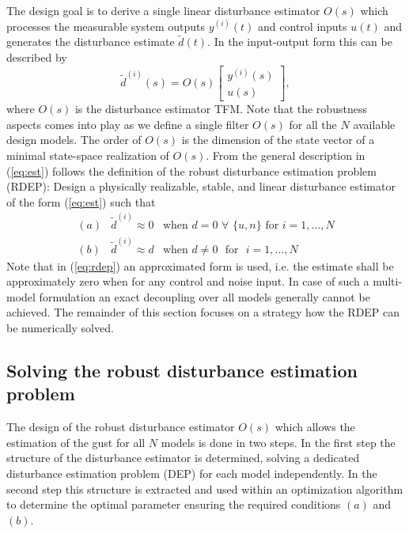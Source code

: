 \documentclass[graybox]{svmult}
\begin{document}
The design goal is to derive a single linear disturbance estimator $O(s)$ which processes the measurable system outputs $y^{(i)}(t)$ and control inputs $u(t)$ and generates the disturbance estimate $\tilde d(t)$. In the input-output form this can be described by
\begin{equation}\label{eq:est}
	\tilde d^{(i)}(s) = O(s)
	\begin{bmatrix}
		y^{(i)}(s) \\ u(s)
	\end{bmatrix},
\end{equation}
where $O(s)$ is the disturbance estimator TFM. Note that the robustness aspects comes into play as we define a single filter $O(s)$ for all the $N$ available design models.
The order of $O(s)$ is the dimension of the state vector of a minimal state-space realization of $O(s)$.
From the general description in (\ref{eq:est}) follows the definition of the robust disturbance estimation problem (RDEP): Design a physically realizable, stable, and linear disturbance estimator of the form (\ref{eq:est}) such that 
\begin{equation}\label{eq:rdep}
	\begin{array}{lll}
		(a) & \tilde d^{(i)}  \approx 0 &\text{when } d = 0  \,\, \forall  \,\, \{u, n \} \text{  for  } i=1,\dots,N\\ 
		(b) &\tilde d^{(i)} \approx d &\text{when } d \neq 0 \,\, \text{  for  } \,\, i=1,\dots,N 
	\end{array}
\end{equation}
Note that in (\ref{eq:rdep}) an approximated form is used, i.e. the estimate shall be approximately zero when for any control and noise input. In case of such a multi-model formulation an exact decoupling over all models generally cannot be achieved. The remainder of this section focuses on a strategy how the RDEP can be numerically solved.



\subsection{Solving the robust disturbance estimation problem}\label{sec:rdep}
The design of the robust disturbance estimator $O(s)$ which allows the estimation of the gust for all $N$ models is done in two steps. In the first step the structure of the disturbance estimator is determined, solving a dedicated disturbance estimation problem (DEP) for each model independently. In the second step this structure is extracted and used within an optimization algorithm to determine the optimal parameter ensuring the required conditions $(a)$ and $(b)$.
\end{document}
